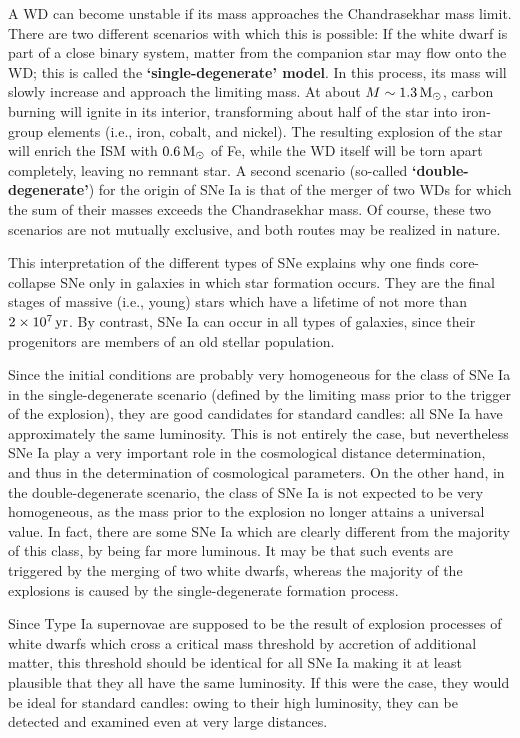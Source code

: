 \documentclass[a4paper,10pt]{article}
\begin{document}
{\noindent}A WD can become unstable if its mass approaches the Chandrasekhar mass limit. There are two different scenarios with which this is possible: If the white dwarf is part of a close binary system, matter from the companion star may flow onto the WD; this is called the \textbf{`single-degenerate' model}. In this process, its mass will slowly increase and approach the limiting mass. At about $M\sim1.3\,{\rm M_\odot}$, carbon burning will ignite in its interior, transforming about half of the star into iron-group elements (i.e., iron, cobalt, and nickel). The resulting explosion of the star will enrich the ISM with $0.6\,{\rm M_\odot}$ of Fe, while the WD itself will be torn apart completely, leaving no remnant star. A second scenario (so-called \textbf{`double-degenerate'}) for the origin of SNe Ia is that of the merger of two WDs for which the sum of their masses exceeds the Chandrasekhar mass. Of course, these two scenarios are not mutually exclusive, and both routes may be realized in nature.

{\noindent}This interpretation of the different types of SNe explains why one finds core-collapse SNe only in galaxies in which star formation occurs. They are the final stages of massive (i.e., young) stars which have a lifetime of not more than $2\times10^7\,{\rm yr}$. By contrast, SNe Ia can occur in all types of galaxies, since their progenitors are members of an old stellar population.

{\noindent}Since the initial conditions are probably very homogeneous for the class of SNe Ia in the single-degenerate scenario (defined by the limiting mass prior to the trigger of the explosion), they are good candidates for standard candles: all SNe Ia have approximately the same luminosity. This is not entirely the case, but nevertheless SNe Ia play a very important role in the cosmological distance determination, and thus in the determination of cosmological parameters. On the other hand, in the double-degenerate scenario, the class of SNe Ia is not expected to be very homogeneous, as the mass prior to the explosion no longer attains a universal value. In fact, there are some SNe Ia which are clearly different from the majority of this class, by being far more luminous. It may be that such events are triggered by the merging of two white dwarfs, whereas the majority of the explosions is caused by the single-degenerate formation process.

{\noindent}Since Type Ia supernovae are supposed to be the result of explosion processes of white dwarfs which cross a critical mass threshold by accretion of additional matter, this threshold should be identical for all SNe Ia making it at least plausible that they all have the same luminosity. If this were the case, they would be ideal for standard candles: owing to their high luminosity, they can be detected and examined even at very large distances. 
\end{document}
